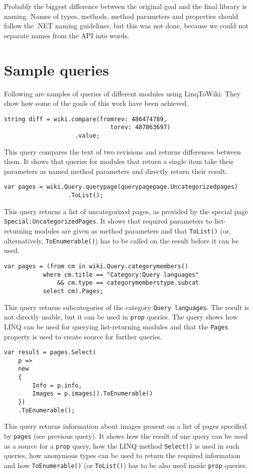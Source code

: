 \medskip

Probably the biggest difference between the original goal and the final library is naming.
Names of types, methods, method parameters and properties should follow the .NET naming guidelines,
but this was not done, because we could not separate names from the \ac{API} into words.

\section*{Sample queries}

Following are samples of queries of different modules using LinqToWiki.
They show how some of the goals of this work have been achieved.

\begin{lstlisting}
string diff = wiki.compare(fromrev: 486474789,
                              torev: 487063697)
                    .value;
\end{lstlisting}

This query compares the text of two revisions and returns differences between them.
It shows that queries for modules that return a single item take their parameters as named method parameters
and directly return their result.

\begin{lstlisting}
var pages = wiki.Query.querypage(querypagepage.Uncategorizedpages)
                  .ToList();
\end{lstlisting}

This query returns a list of uncategorized pages,
as provided by the special page \texttt{Special:UncategorizedPages}.
It shows that required parameters to list-returning modules are given as method parameters
and that \lstinline{ToList()} (or, alternatively, \lstinline{ToEnumerable()})
has to be called on the result before it can be used.

\begin{lstlisting}
var pages = (from cm in wiki.Query.categorymembers()
	       where cm.title == "Category:Query languages"
	           && cm.type == categorymemberstype.subcat
	       select cm).Pages;
\end{lstlisting}

This query returns subcategories of the category \texttt{Query languages}.
The result is not directly usable, but it can be used in \texttt{prop} queries.
The query shows how LINQ can be used for querying list-returning modules
and that the \lstinline{Pages} property is used to create source for further queries.

\begin{lstlisting}
var result = pages.Select(
	p =>
	new
	{
		Info = p.info,
		Images = p.images().ToEnumerable()
	})
	.ToEnumerable();
\end{lstlisting}

This query returns information about images present on a list of pages specified by \lstinline{pages}
(see previous query).
It shows how the result of one query can be used as a source for a \texttt{prop} query,
how the LINQ method \lstinline{Select()} is used in such queries,
how anonymous types can be used to return the required information
and how \lstinline{ToEnumerable()} (or \lstinline{ToList()}) has to be also used inside \texttt{prop} queries.
